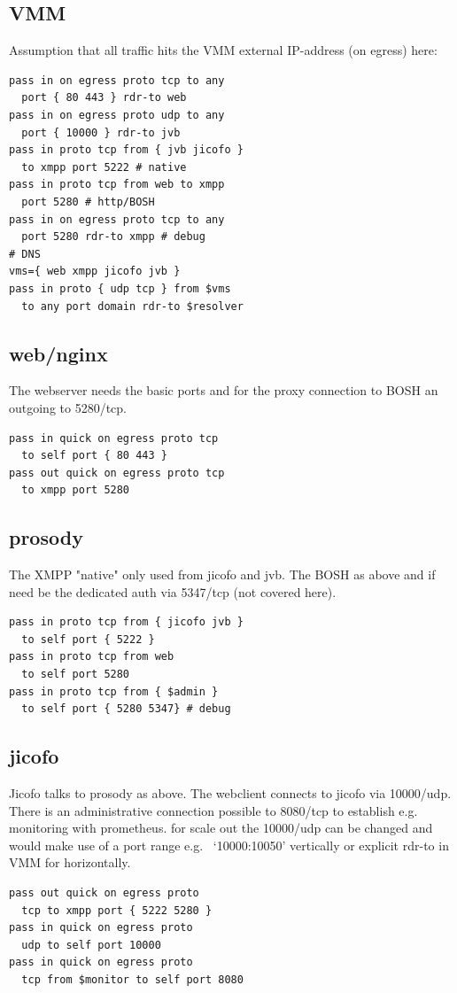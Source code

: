 \documentclass[conference]{IEEEtran}
\begin{document}
\subsection{VMM}
Assumption that all traffic hits the VMM external IP-address (on egress) here:
\begin{verbatim}
pass in on egress proto tcp to any 
  port { 80 443 } rdr-to web
pass in on egress proto udp to any 
  port { 10000 } rdr-to jvb
pass in proto tcp from { jvb jicofo } 
  to xmpp port 5222 # native
pass in proto tcp from web to xmpp 
  port 5280 # http/BOSH
pass in on egress proto tcp to any 
  port 5280 rdr-to xmpp # debug
# DNS
vms={ web xmpp jicofo jvb }
pass in proto { udp tcp } from $vms 
  to any port domain rdr-to $resolver
\end{verbatim}
\subsection{web/nginx}
The webserver needs the basic ports and for the proxy connection to BOSH an outgoing to 5280/tcp.
\begin{verbatim}
pass in quick on egress proto tcp
  to self port { 80 443 }
pass out quick on egress proto tcp
  to xmpp port 5280
\end{verbatim}
\subsection{prosody}
The XMPP "native" only used from jicofo and jvb. The BOSH as above and if need be
the dedicated auth via 5347/tcp (not covered here).
\begin{verbatim}
pass in proto tcp from { jicofo jvb }
  to self port { 5222 }
pass in proto tcp from web
  to self port 5280
pass in proto tcp from { $admin }
  to self port { 5280 5347} # debug
\end{verbatim}
\subsection{jicofo}
Jicofo talks to prosody as above. The webclient connects to jicofo via 10000/udp. There
is an administrative connection possible to 8080/tcp to establish e.g. monitoring with prometheus.
for scale out the 10000/udp can be changed and would make use of a port range e.g. 
‘10000:10050’ vertically or explicit rdr-to in VMM for horizontally.

\begin{verbatim}
pass out quick on egress proto 
  tcp to xmpp port { 5222 5280 }
pass in quick on egress proto 
  udp to self port 10000
pass in quick on egress proto 
  tcp from $monitor to self port 8080
\end{verbatim}
\end{document}
